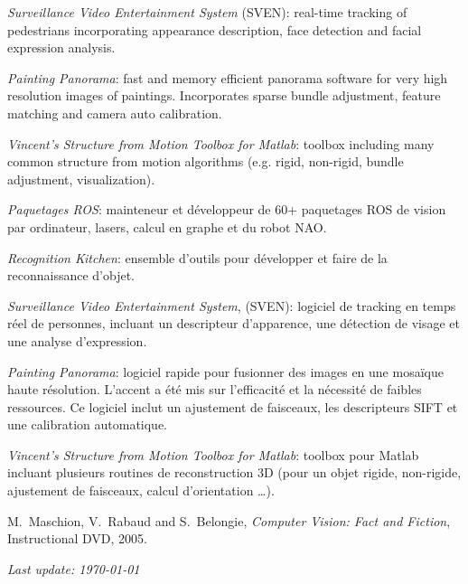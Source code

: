 \documentclass{article}
\begin{document}
\begin{llist}
{{\em Surveillance Video Entertainment System} (SVEN): real-time tracking of pedestrians incorporating appearance 
description, face detection and facial expression analysis.

{\em Painting Panorama}: fast and memory efficient panorama software for very high resolution images of paintings. 
Incorporates sparse bundle adjustment, feature matching and camera auto calibration.

{\em Vincent's Structure from Motion Toolbox for Matlab}: toolbox including many common structure from motion algorithms 
(e.g. rigid, non-rigid, bundle adjustment, visualization).
}
{
{\em Paquetages ROS}: mainteneur et d\'{e}veloppeur de 60+ paquetages ROS de vision par ordinateur, lasers, calcul
en graphe et du robot NAO.

{\em Recognition Kitchen}: ensemble d'outils pour d\'{e}velopper et faire de la reconnaissance d'objet.

{\em Surveillance Video Entertainment System}, (SVEN): logiciel de tracking en temps r\'eel de personnes, incluant un 
descripteur d'apparence, une d\'{e}tection de visage et une analyse d'expression.

{\em Painting Panorama}: logiciel rapide pour fusionner des images en une mosa\"{i}que haute r\'{e}solution.  L'accent 
a \'{e}t\'{e} mis sur l'efficacit\'{e} et la n\'{e}cessit\'{e} de faibles ressources.  Ce logiciel inclut un ajustement 
de faisceaux, les descripteurs SIFT et une calibration automatique.

{\em Vincent's Structure from Motion Toolbox for Matlab}: toolbox pour Matlab incluant plusieurs routines de 
reconstruction 3D (pour un objet rigide, non-rigide, ajustement de faisceaux, calcul d'orientation \dots).
}

{
}
{
}


{
}
{
}


M.~Maschion, V.~Rabaud and S.~Belongie, {\em Computer Vision: Fact and Fiction},
Instructional DVD, 2005.





\end{llist}

{\em Last update: \today}
\end{document}
